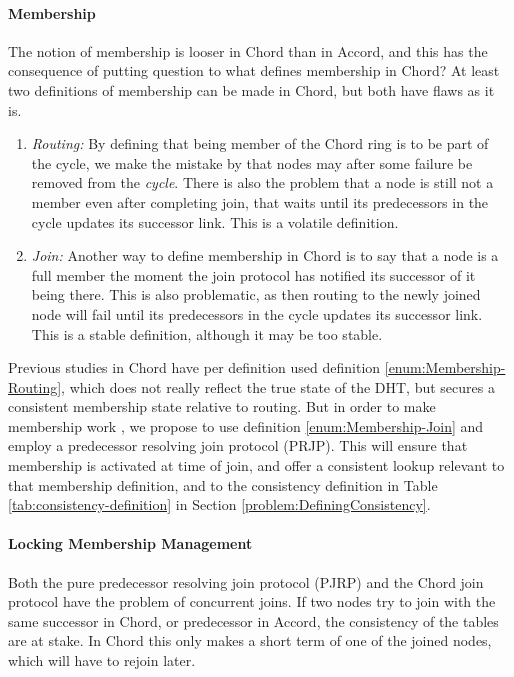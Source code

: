 \paragraph{Membership}

The notion of membership is looser in Chord than in Accord, and this has the
 consequence of putting question to what defines membership in Chord? At least two
 definitions of membership can be made in Chord, but both have flaws as it is.

\begin{enumerate}
\item \emph{Routing:}\label{enum:Membership-Routing}
    By defining that being member of the Chord ring is to be
    part of the cycle\cite{liben-nowell-02-observations}, we make the mistake by
    that nodes may after some failure be removed from the \emph{cycle}. There is
    also the problem that a node is still not a member even after completing join,
    that waits until its predecessors in the cycle updates its successor link. This
    is a volatile definition.
\item \emph{Join:}\label{enum:Membership-Join}
    Another way to define membership in Chord is to say that a node
    is a full member the moment the join protocol has notified its successor of it
    being there. This is also problematic, as then routing to the newly joined
    node will fail until its predecessors in the cycle updates its successor link.
    This is a stable definition, although it may be too stable.
\end{enumerate}

Previous studies in Chord have per definition used definition
 \ref{enum:Membership-Routing}, which does not really reflect the true state of the
 DHT, but secures a consistent membership state relative to routing. But in order
 to make membership work , we propose to use definition
 \ref{enum:Membership-Join} and employ a predecessor resolving join protocol (PRJP). This
 will ensure that membership is activated at time of join, and offer a consistent
 lookup relevant to that membership definition, and to the consistency definition
 in Table \ref{tab:consistency-definition} in Section \ref{problem:DefiningConsistency}.

\paragraph{Locking Membership Management}

Both the pure predecessor resolving join protocol (PJRP) and the Chord join protocol
 have the problem of concurrent joins. If two nodes try to join with the same
 successor in Chord, or predecessor in Accord, the consistency of the tables are
 at stake. In Chord this only makes a short term  of one of
 the joined nodes, which will have to rejoin later.

